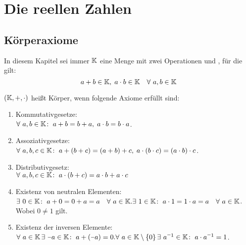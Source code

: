 \documentclass[../ana1.tex]{subfiles}
\begin{document}
\setcounter{section}{2}

\section{Die reellen Zahlen}

\subsection{Körperaxiome}
\begin{prosa}
	In diesem Kapitel sei immer \(\mathbb{K}  \) eine Menge mit zwei Operationen \gqq{\(+  \)} und 
	\gqq{\(\cdot \)}, für die gilt:
	\[a + b \in \K \ko  \; a \cdot b \in \K \quad \forall \, a \ko b \in \K  \]
\end{prosa}

\begin{defi}[Körperaxiome]
	\((\mathbb{K} , + , \cdot) \) heißt Körper, wenn folgende Axiome erfüllt sind:
	\begin{enumerate}[label= (K\arabic*)]
		\item\label{ax:K1}Kommutativgesetze: \\
			  \(\forall \, a \ko b \in \K \colon \; a+b=b+a \ko  \; a \cdot b = b \cdot a \).
		\item\label{ax:K2}Assoziativgesetze: \\
			  \(\forall \, a \ko b \ko c \in \K \colon \; a+(b+c) = (a+b)+c \ko  \; a \cdot (b \cdot c) = (a \cdot b)\cdot c \).
		\item\label{ax:K3}Distributivgesetz: \\
			  \(\forall \, a \ko b \ko c \in \K \colon \; a \cdot (b+c) = a \cdot b + a \cdot c \)
		\item\label{ax:K4}Existenz von neutralen Elementen: \\
			  \(\exists \, 0 \in \K \colon \; a + 0 = 0 + a = a \quad \forall \, a \in \K. \\
				\exists \, 1 \in \K \colon \; a \cdot 1 = 1 \cdot a = a \quad \forall \, a \in \K \). \\
			  Wobei \(0 \neq 1 \) gilt. 
		\item\label{ax:K5}Existenz der inversen Elemente: \\
		      \(\forall \, a \in \K \, \exists  \, \minus a \in \K \colon \; a + (\minus a) = 0. \\
			    \forall \, a \in \K \setminus \set{0} \, \exists \, a^{\minus 1} \in \K \colon \; a \cdot a^{\minus 1} = 1 \). \\
	\end{enumerate}
\end{defi}
\end{document}
